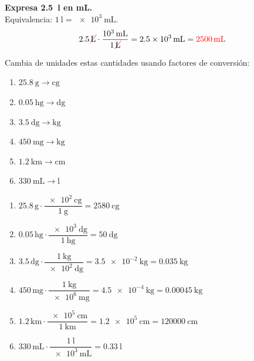 \begin{example}
    \textbf{Expresa \qty{2.5}{\litre} en \unit{\mL}.} \\
    Equivalencia: \(\qty{1}{\litre} = \qty{e3}{\mL}\).
    \begin{equation*}
        \num{2.5}\,\cancelunit{\litre} \cdot \dfrac{\qty{e3}{\mL}}{1\,\cancelunit{\litre}} = \qty{2.5e3}{\mL} = \textcolor{red}{\qty{2500}{\mL}}
    \end{equation*}
\end{example}

\begin{exercise}
    Cambia de unidades estas cantidades usando factores de conversión:
    \begin{enumerate}[label=\letraminuscula]
        \item \(\qty{25.8}{\g} \to \unit{\centi\gram}\)
        \item \(\qty{0.05}{\hecto\gram} \to \unit{\deci\gram}\)
        \item \(\qty{3.5}{\deca\gram} \to \unit{\kg}\)
        \item \(\qty{450}{\mg} \to \unit{\kg}\)
        \item \(\qty{1.2}{\km} \to \unit{\cm}\)
        \item \(\qty{330}{\mL} \to \unit{\litre}\)
    \end{enumerate}
    \begin{solu}
        \begin{enumerate}[label=\alph*)]
            \item \(\num{25.8}\,\unit{\g} \cdot \dfrac{\qty{e2}{\centi\gram}}{\qty{1}{\g}} = \qty{2580}{\centi\gram}\)
            \item \(\num{0.05}\,\unit{\hecto\gram} \cdot \dfrac{\qty{e3}{\deci\gram}}{\qty{1}{\hecto\gram}} = \qty{50}{\deci\gram}\)
            \item \(\num{3.5}\,\unit{\deca\gram} \cdot \dfrac{\qty{1}{\kg}}{\qty{e2}{\deca\gram}} = \qty{3.5e-2}{\kg} = \qty{0.035}{\kg}\)
            \item \(\num{450}\,\unit{\mg} \cdot \dfrac{\qty{1}{\kg}}{\qty{e6}{\mg}} = \qty{4.5e-4}{\kg} = \qty{0.00045}{\kg}\)
            \item \(\num{1.2}\,\unit{\km} \cdot \dfrac{\qty{e5}{\cm}}{\qty{1}{\km}} = \qty{1.2e5}{\cm} = \qty{120000}{\cm}\)
            \item \(\num{330}\,\unit{\mL} \cdot \dfrac{\qty{1}{\litre}}{\qty{e3}{\mL}} = \qty{0.33}{\litre}\)
        \end{enumerate}
    \end{solu}
\end{exercise}

